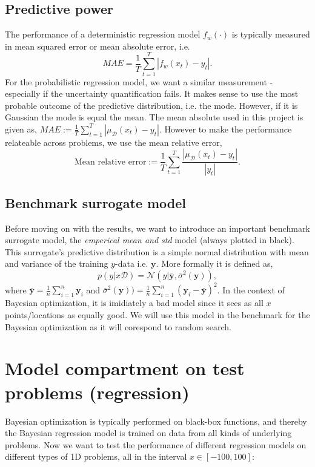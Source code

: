 \subsection{Predictive power}
The performance of a deterministic regression model $f_w(\cdot)$ is typically measured in mean squared error or 
mean absolute error, i.e. 
$$MAE = \frac{1}{T}\sum_{t=1}^T |f_{w}(x_t) - y_t|.$$ For the probabilistic regression model, we
want a similar measurement - especially if the uncertainty quantification fails. It makes sense to use
the most probable outcome of the predictive distribution, i.e. the mode. However, if it is Gaussian
the mode is equal the mean. The mean absolute used in this project is given as, 
$MAE :=\frac{1}{T}\sum_{t=1}^T |\mu_{\mathcal{D}}(x_t) - y_t|.$ However to make the performance
relateable across problems, we use the mean relative error, 
$$\text{Mean relative error} :=\frac{1}{T}\sum_{t=1}^T \frac{|\mu_{\mathcal{D}}(x_t) - y_t|}{|y_t|}.$$

\subsection{Benchmark surrogate model}
Before moving on with the results, we want to introduce an important benchmark surrogate model, the
\textit{emperical mean and std} model (always plotted in black). This surrogate's predictive distribution
is a simple normal distribution with mean and variance of the training $y$-data i.e. $\textbf{y}$. More
formally it is defined as, 
$$p(y|x\mathcal{D}) = \mathcal{N}(y| \bar{\textbf{y}} , \bar{\sigma}^2 (\textbf{y})),$$ where
$\bar{\textbf{y}} = \frac{1}{n}\sum_{i=1}^n \textbf{y}_i $ and $\bar{\sigma}^2 (\textbf{y})) =
\frac{1}{n}\sum_{i=1}^n (\textbf{y}_i-\bar{\textbf{y}})^2$. In the context of Bayesian optimization,
it is imidiately a bad model since it sees as all $x$ points/locations as equally good. We will use
this model in the benchmark for the Bayesian optimization as it will corespond to random search. 
 
\section{Model compartment on test problems (regression)}
Bayesian optimization is typically performed on black-box functions, and thereby the Bayesian
regression model is trained on data from all kinds of underlying problems. Now we want to test the
performance of different regression models on different types of 1D problems, all in the interval $x
\in [-100,100]$:

